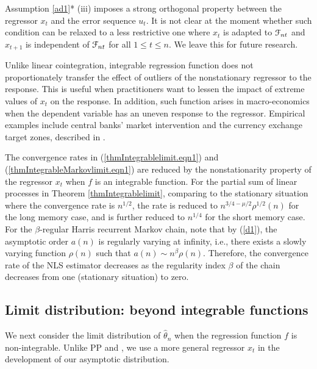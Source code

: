 \begin{rem} Assumption \ref{ad1}* (iii) imposes a strong orthogonal property between the regressor $x_t$ and the error sequence $u_t$. It is not clear at the moment whether such condition can be relaxed to a less restrictive one where $x_t$ is adapted to $\mathcal F_{nt}$ and $x_{t+1}$ is independent of $\mathcal F_{nt}$ for all $1 \le t \le n$. We leave this for future research.
\end{rem}

\begin{rem}
Unlike linear cointegration, integrable regression function does not proportionately transfer the effect of outliers of the nonstationary regressor to the response. This is useful when practitioners want to lessen the impact of extreme values of $x_t$ on the response. In addition, such function arises in macro-economics when the dependent variable has an uneven response to the regressor. Empirical examples include central banks' market intervention and the currency exchange target zones, described in \cite{phillips2001}.
\end{rem}

\begin{rem}
The convergence rates in (\ref{thmIntegrablelimit.eqn1}) and (\ref{thmIntegrableMarkovlimit.eqn1}) are reduced by the nonstationarity property of the regressor $x_t$ when $f$ is an integrable function. For the partial sum of linear processes in Theorem \ref{thmIntegrablelimit}, comparing to the stationary situation where the convergence rate is $n^{1/2}$, the rate is reduced to $n^{3 / 4 - \mu / 2}\rho^{1/2}(n)$ for the long memory case, and is further reduced to $n^{1/4}$ for the short memory case. For the $\beta$-regular Harris recurrent Markov chain, note that by (\ref{d1}), the asymptotic order $a(n)$ is regularly varying at infinity, i.e., there exists a slowly varying function $\rho(n)$ such that $a(n) \sim  n^{\beta} \rho(n)$. Therefore, the convergence rate of the NLS estimator decreases as the regularity index $\beta$ of the chain decreases from one (stationary situation) to zero.
\end{rem}

\subsection{Limit distribution: beyond integrable functions } 

We next consider the limit distribution of $\hat{\theta}_n$ when the regression function $f$ is non-integrable. Unlike PP and \cite{changparkphillips2001}, we use  a more general regressor $x_t$ in the development of our asymptotic distribution.

